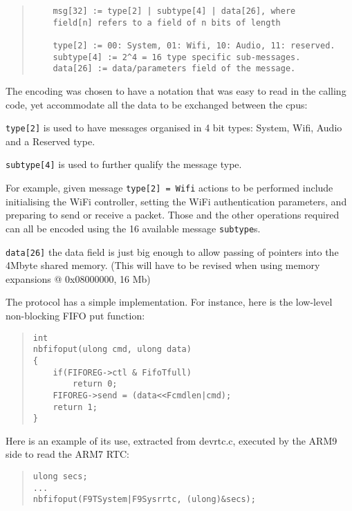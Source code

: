\documentclass[11pt]{p9article}
\begin{document}
\begin{quote}
\begin{verbatim}
	msg[32] := type[2] | subtype[4] | data[26], where
	field[n] refers to a field of n bits of length
		
	type[2] := 00: System, 01: Wifi, 10: Audio, 11: reserved.
	subtype[4] := 2^4 = 16 type specific sub-messages.
	data[26] := data/parameters field of the message.
\end{verbatim}
\end{quote}
		
The encoding was chosen to have a notation that was easy to read in the calling code,
yet accommodate all the data to be exchanged between the cpus:

\begin{description}
\item \verb+type[2]+
is used to have messages organised in 4 bit types: System, Wifi, Audio and a Reserved type.

\item \verb+subtype[4]+
is used to further qualify the message type.

For example, given message \verb+type[2] = Wifi+ actions to be performed include
initialising the WiFi controller, setting the WiFi authentication parameters,
and preparing to send or receive a packet.
Those and the other operations required can all be encoded using the 16 available message \verb+subtype+s.

\item \verb+data[26]+
the data field is just big enough to allow passing of pointers into the 4Mbyte shared memory.
(This will have to be revised when using memory expansions @ 0x08000000, 16 Mb)	
\end{description}

The protocol has a simple implementation. For instance, here is the low-level non-blocking FIFO put function:

\begin{quote}
\begin{verbatim}
int
nbfifoput(ulong cmd, ulong data)
{
    if(FIFOREG->ctl & FifoTfull)
        return 0;
    FIFOREG->send = (data<<Fcmdlen|cmd);
    return 1;
}
\end{verbatim}
\end{quote}

Here is an example of its use, extracted from devrtc.c, executed by the ARM9 side to read the ARM7 RTC:

\begin{quote}
\begin{verbatim}
ulong secs;
...
nbfifoput(F9TSystem|F9Sysrrtc, (ulong)&secs);
\end{verbatim}
\end{quote}
\end{document}

